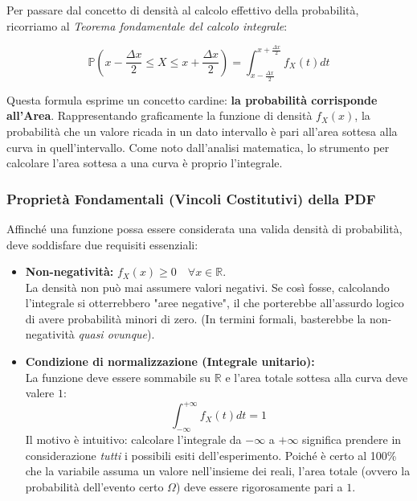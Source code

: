 Per passare dal concetto di densità al calcolo effettivo della probabilità, ricorriamo al \textit{Teorema fondamentale del calcolo integrale}:

\begin{equation}
\mathbb{P}\left(x - \frac{\Delta x}{2} \le X \le x + \frac{\Delta x}{2}\right) = \int_{x - \frac{\Delta x}{2}}^{x + \frac{\Delta x}{2}} f_X(t)dt
\end{equation}

Questa formula esprime un concetto cardine: \textbf{la probabilità corrisponde all'Area}. 
Rappresentando graficamente la funzione di densità $f_X(x)$, la probabilità che un valore ricada in un dato intervallo è pari all'area sottesa alla curva in quell'intervallo. Come noto dall'analisi matematica, lo strumento per calcolare l'area sottesa a una curva è proprio l'integrale.

\subsubsection{Proprietà Fondamentali (Vincoli Costitutivi) della PDF}
Affinché una funzione possa essere considerata una valida densità di probabilità, deve soddisfare due requisiti essenziali:

\begin{itemize}
    \item \textbf{Non-negatività:} $f_X(x) \ge 0 \quad \forall x \in \mathbb{R}$. \\
    La densità non può mai assumere valori negativi. Se così fosse, calcolando l'integrale si otterrebbero "aree negative", il che porterebbe all'assurdo logico di avere probabilità minori di zero. (In termini formali, basterebbe la non-negatività \textit{quasi ovunque}).

    \item \textbf{Condizione di normalizzazione (Integrale unitario):} \\
    La funzione deve essere sommabile su $\mathbb{R}$ e l'area totale sottesa alla curva deve valere $1$:
    \begin{equation}
    \int_{-\infty}^{+\infty} f_X(t)dt = 1
    \end{equation}
    Il motivo è intuitivo: calcolare l'integrale da $-\infty$ a $+\infty$ significa prendere in considerazione \textit{tutti} i possibili esiti dell'esperimento. Poiché è certo al 100\% che la variabile assuma un valore nell'insieme dei reali, l'area totale (ovvero la probabilità dell'evento certo $\Omega$) deve essere rigorosamente pari a $1$.
\end{itemize}

